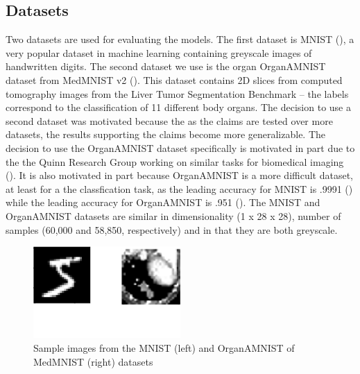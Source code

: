 \documentclass[./dissertation.tex]{subfiles}
\begin{document}
    \subsection{Datasets}
    Two datasets are used for evaluating the models. The first dataset is MNIST (\cite{lecun-mnisthandwrittendigit-2010}), a very popular dataset in machine learning containing greyscale images of handwritten digits. The second dataset we use is the organ OrganAMNIST dataset from MedMNIST v2 (\cite{medmnistv2}). This dataset contains 2D slices from computed tomography images from the Liver Tumor Segmentation Benchmark -- the labels correspond to the classification of 11 different body organs. The decision to use a second dataset was motivated because the as the claims are tested over more datasets, the results supporting the claims become more generalizable. The decision to use the OrganAMNIST dataset specifically is motivated in part due to the the Quinn Research Group working on similar tasks for biomedical imaging (\cite{Zain2020TowardsAU}). It is also motivated in part because OrganAMNIST is a more difficult dataset, at least for a the classfication task, as the leading accuracy for MNIST is .9991 (\cite{DBLP:journals/corr/abs-2008-10400}) while the leading accuracy for OrganAMNIST is .951 (\cite{medmnistv2}). The MNIST and OrganAMNIST datasets are similar in dimensionality (1 x 28 x 28), number of samples (60,000 and 58,850, respectively) and in that they are both greyscale.
    
    \begin{figure}[h]
        \centering\includegraphics[width=0.5\textwidth]{figures/cropped_datasets.png}
        \caption{Sample images from the MNIST (left) and OrganAMNIST of MedMNIST (right) datasets}
        \label{Datasets Diagram}
    \end{figure}
    
\end{document}
